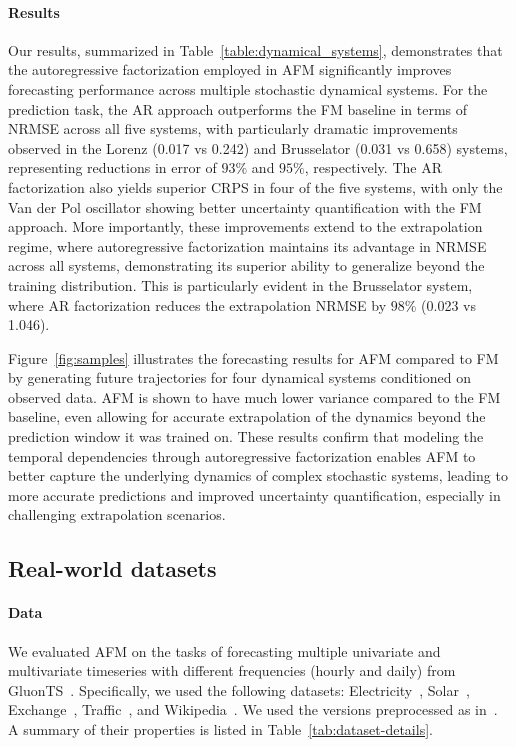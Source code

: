\documentclass[a4paper,10pt,twocolumn,preprint,3p]{elsarticle}
\begin{document}
\paragraph{Results}
Our results, summarized in Table~\ref{table:dynamical_systems}, demonstrates that the autoregressive factorization employed in AFM significantly improves forecasting performance across multiple stochastic dynamical systems. For the prediction task, the AR approach outperforms the FM baseline in terms of NRMSE across all five systems, with particularly dramatic improvements observed in the Lorenz (0.017 vs 0.242) and Brusselator (0.031 vs 0.658) systems, representing reductions in error of $93\%$ and $95\%$, respectively. The AR factorization also yields superior CRPS in four of the five systems, with only the Van der Pol oscillator showing better uncertainty quantification with the FM approach. More importantly, these improvements extend to the extrapolation regime, where autoregressive factorization maintains its advantage in NRMSE across all systems, demonstrating its superior ability to generalize beyond the training distribution. This is particularly evident in the Brusselator system, where AR factorization reduces the extrapolation NRMSE by $98\%$ (0.023 vs 1.046). 


Figure~\ref{fig:samples} illustrates the forecasting results for AFM compared to FM by generating future trajectories for four dynamical systems conditioned on observed data. AFM is shown to have much lower variance compared to the FM baseline, even allowing for accurate extrapolation of the dynamics beyond the prediction window it was trained on. These results confirm that modeling the temporal dependencies through autoregressive factorization enables AFM to better capture the underlying dynamics of complex stochastic systems, leading to more accurate predictions and improved uncertainty quantification, especially in challenging extrapolation scenarios.

\subsection{Real-world datasets}

\paragraph{Data} We evaluated AFM on the tasks
of forecasting multiple univariate and multivariate timeseries with different frequencies (hourly and daily) from GluonTS~\citep{alexandrov2020gluonts}. Specifically, we used the following datasets: Electricity~\citep{lai2018modeling}, Solar~\citep{lai2018modeling}, Exchange~\citep{dua2017uci}, Traffic~\citep{dua2017uci}, and Wikipedia~\citep{gasthaus2019probabilistic}. 
We used the versions preprocessed as in~\citep{salinas2019high}. A summary of their properties is listed in Table~\ref{tab:dataset-details}.
\end{document}

